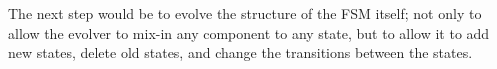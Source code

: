 \documentclass[12pt,journal,compsoc]{IEEEtran}
\begin{document}
The next step would be to evolve the structure of the FSM itself; not only to allow the evolver to mix-in any component to any state, but to allow it to add new states, delete old states, and change the transitions between the states.

\end{document}
